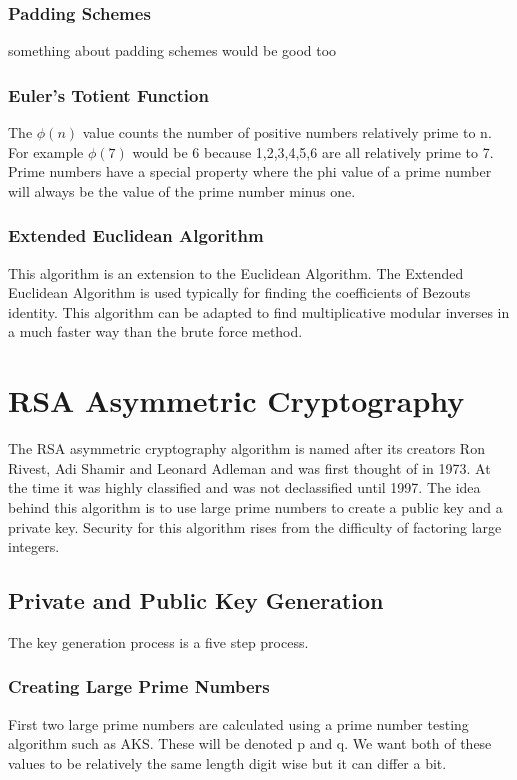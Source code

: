 \documentclass[conference]{IEEEtran}
\begin{document}
\subsubsection{Padding Schemes}
something about padding schemes would be good too
\color{black}


\subsubsection{Euler's Totient Function}
The $\phi \left( n \right)$ value counts the number of positive numbers relatively prime to n.
For example $\phi(7)$ would be 6 because 1,2,3,4,5,6 are all relatively prime to 7.
Prime numbers have a special property where the phi value of a prime number will always be the value of the prime number minus one.



\subsubsection{Extended Euclidean Algorithm}
This algorithm is an extension to the Euclidean Algorithm. The Extended Euclidean Algorithm is used typically for finding the coefficients of Bezouts identity. This algorithm can be adapted to find multiplicative modular inverses in a much faster way than the brute force method.

\section{RSA Asymmetric Cryptography}


The RSA asymmetric cryptography algorithm is named after its creators Ron Rivest, Adi Shamir and Leonard Adleman and was first thought of in 1973.
At the time it was highly classified and was not declassified until 1997.
The idea behind this algorithm is to use large prime numbers to create a public key and a private key.
Security for this algorithm rises from the difficulty of factoring large integers.

\subsection{Private and Public Key Generation}
The key generation process is a five step process.

\subsubsection{Creating Large Prime Numbers}
First two large prime numbers are calculated using a prime number testing algorithm such as AKS. These will be denoted p and q. We want both of these values to be relatively the same length digit wise but it can differ a bit.
\end{document}
